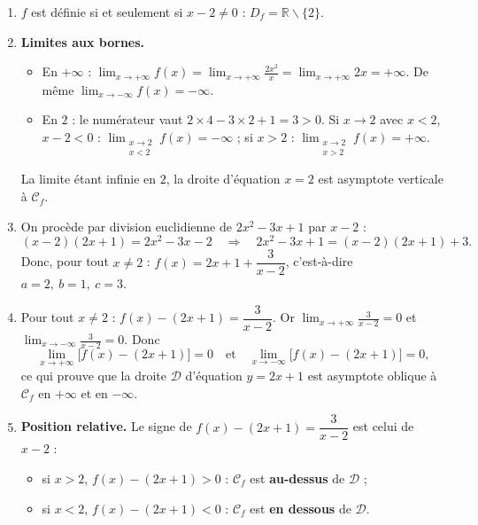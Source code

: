 \documentclass[11pt]{article}
\newcommand{\cle}[1]{{\popxbold\color{popdark}#1}}
\def\setminus{\mathbin{\backslash}}\let\smallsetminus\setminus
\begin{document}
\begin{corrige}
\begin{enumerate}
\item $f$ est définie si et seulement si $x-2\neq 0$ : $D_f=\mathbb{R}\setminus\{2\}$.
\item \textbf{Limites aux bornes.}
\begin{itemize}
\item En $+\infty$ : $\displaystyle\lim_{x\to +\infty}f(x)=\lim_{x\to +\infty}\frac{2x^2}{x}=\lim_{x\to +\infty}2x=+\infty$. De même $\displaystyle\lim_{x\to -\infty}f(x)=-\infty$.
\item En $2$ : le numérateur vaut $2\times 4-3\times 2+1=3>0$. Si $x\to 2$ avec $x<2$, $x-2<0$ : $\displaystyle\lim_{\substack{x\to 2\\ x<2}}f(x)=-\infty$ ; si $x>2$ : $\displaystyle\lim_{\substack{x\to 2\\ x>2}}f(x)=+\infty$.
\end{itemize}
La limite étant infinie en $2$, la droite d'équation $\boxed{x=2}$ est \cle{asymptote verticale} à $\mathscr{C}_f$.
\item On procède par division euclidienne de $2x^2-3x+1$ par $x-2$ :
\[ (x-2)(2x+1)=2x^2-3x-2 \quad\Longrightarrow\quad 2x^2-3x+1=(x-2)(2x+1)+3. \]
Donc, pour tout $x\neq 2$ : $f(x)=2x+1+\dfrac{3}{x-2}$, c'est-à-dire $\boxed{a=2,\ b=1,\ c=3}$.
\item Pour tout $x\neq 2$ : $f(x)-(2x+1)=\dfrac{3}{x-2}$. Or $\displaystyle\lim_{x\to +\infty}\frac{3}{x-2}=0$ et $\displaystyle\lim_{x\to -\infty}\frac{3}{x-2}=0$. Donc
\[ \lim_{x\to +\infty}\bigl[f(x)-(2x+1)\bigr]=0 \quad\text{et}\quad \lim_{x\to -\infty}\bigl[f(x)-(2x+1)\bigr]=0, \]
ce qui prouve que la droite $\mathscr{D}$ d'équation $y=2x+1$ est \cle{asymptote oblique} à $\mathscr{C}_f$ en $+\infty$ et en $-\infty$.
\item \textbf{Position relative.} Le signe de $f(x)-(2x+1)=\dfrac{3}{x-2}$ est celui de $x-2$ :
\begin{itemize}
\item si $x>2$, $f(x)-(2x+1)>0$ : $\mathscr{C}_f$ est \textbf{au-dessus} de $\mathscr{D}$ ;
\item si $x<2$, $f(x)-(2x+1)<0$ : $\mathscr{C}_f$ est \textbf{en dessous} de $\mathscr{D}$.
\end{itemize}
\end{enumerate}
\end{corrige}
\end{document}
